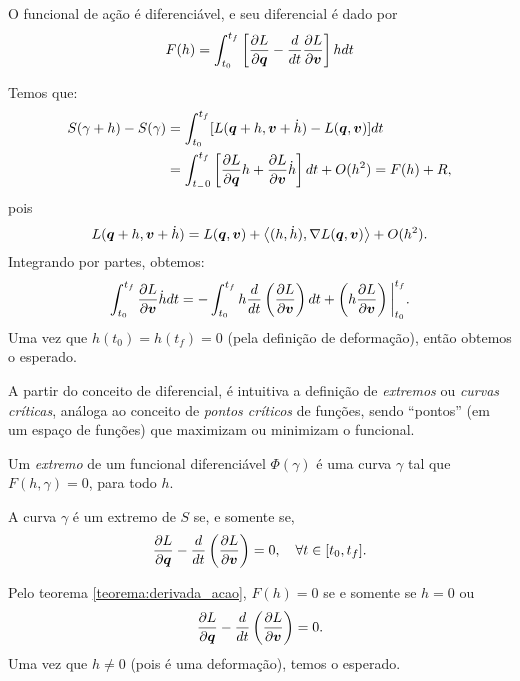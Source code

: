 \begin{theorem}\label{teorema:derivada_acao}
    O funcional de ação é diferenciável, e seu diferencial é dado por
    \begin{equation}
        F(h) = \int_{t_0}^{t_f} \left[ \dfrac{\partial L}{\partial \bm q} - \dfrac{d }{d t} \dfrac{\partial L}{\partial \bm v} \right] h dt
    \end{equation}
\end{theorem}
\begin{Proof}
    Temos que:
    \begin{align*}
        S(\gamma + h) - S(\gamma) 
        &= \int_{t_0}^{t_f} [L(\bm q + h, \bm v + \dot h) - L(\bm q, \bm v)] dt \\
        &= \int_{t_-0}^{t_f} \left[\dfrac{\partial L}{\partial \bm q} h + \dfrac{\partial L}{\partial \bm v} \dot h\right] dt + O(h^2) = F(h) + R,
    \end{align*}
    pois
    \begin{equation*}
        L(\bm q + h, \bm v + \dot h) = L(\bm q, \bm v) + \left\langle (h, \dot h), \nabla L(\bm q, \bm v) \right\rangle + O(h^2).
    \end{equation*}
    Integrando por partes, obtemos:
    \begin{equation*}
        \int_{t_0}^{t_f} \dfrac{\partial L}{\partial \bm v} \dot h dt =
        - \int_{t_0}^{t_f} h \dfrac{d }{d t} \left(\dfrac{\partial L}{\partial \bm v}\right) dt + \left(h \dfrac{\partial L}{\partial \bm v} \right)\bigg\rvert_{t_0}^{t_f}.
    \end{equation*}
    Uma vez que $h(t_0) = h(t_f) = 0$ (pela definição de deformação), então obtemos o esperado.
\end{Proof}

A partir do conceito de diferencial, é intuitiva a definição de \textit{extremos} ou \textit{curvas críticas}, análoga ao conceito de \textit{pontos críticos} de funções, sendo ``pontos'' (em um espaço de funções) que maximizam ou minimizam o funcional.

\begin{definition}
    Um \textit{extremo} de um funcional diferenciável $\Phi(\gamma)$ é uma curva $\gamma$ tal que $F(h, \gamma) = 0$, para todo $h$.
\end{definition}

\begin{theorem}
    A curva $\gamma$ é um extremo de $S$ se, e somente se,
    \begin{equation}\label{eq:euler_lagrange}
        \dfrac{\partial L}{\partial \bm q} - \dfrac{d }{d t}\left(\dfrac{\partial L}{\partial \bm v}\right) = 0, \quad \forall t \in [t_0, t_f].
    \end{equation}
\end{theorem}
\begin{Proof}
    Pelo teorema \ref{teorema:derivada_acao}, $F(h) = 0$ se e somente se $h = 0$ ou
    \begin{equation*}
        \dfrac{\partial L}{\partial \bm q} - \dfrac{d }{d t}\left(\dfrac{\partial L}{\partial \bm v}\right) = 0.
    \end{equation*}
    Uma vez que $h \neq 0$ (pois é uma deformação), temos o esperado.
\end{Proof}

